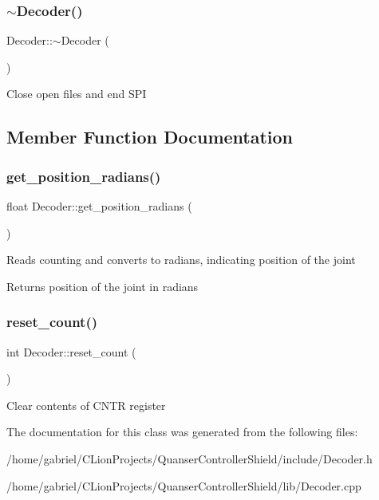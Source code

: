 \subsubsection{\texorpdfstring{$\sim$\+Decoder()}{~Decoder()}}
{\footnotesize\ttfamily Decoder\+::$\sim$\+Decoder (\begin{DoxyParamCaption}{ }\end{DoxyParamCaption})\hspace{0.3cm}{\ttfamily [virtual]}}

Close open files and end S\+PI 

\subsection{Member Function Documentation}
\mbox{\label{classDecoder_a27b38533ded3df3b1d81011105d0ae73}} 
\subsubsection{\texorpdfstring{get\+\_\+position\+\_\+radians()}{get\_position\_radians()}}
{\footnotesize\ttfamily float Decoder\+::get\+\_\+position\+\_\+radians (\begin{DoxyParamCaption}{ }\end{DoxyParamCaption})}

Reads counting and converts to radians, indicating position of the joint \begin{DoxyReturn}{Returns}
position of the joint in radians 
\end{DoxyReturn}
\mbox{\label{classDecoder_aaf6ef0ea1fb97ae3e2b2c764529134bc}} 
\subsubsection{\texorpdfstring{reset\+\_\+count()}{reset\_count()}}
{\footnotesize\ttfamily int Decoder\+::reset\+\_\+count (\begin{DoxyParamCaption}{ }\end{DoxyParamCaption})}

Clear contents of C\+N\+TR register 

The documentation for this class was generated from the following files\+:\begin{DoxyCompactItemize}
\item 
/home/gabriel/\+C\+Lion\+Projects/\+Quanser\+Controller\+Shield/include/Decoder.\+h\item 
/home/gabriel/\+C\+Lion\+Projects/\+Quanser\+Controller\+Shield/lib/Decoder.\+cpp\end{DoxyCompactItemize}
